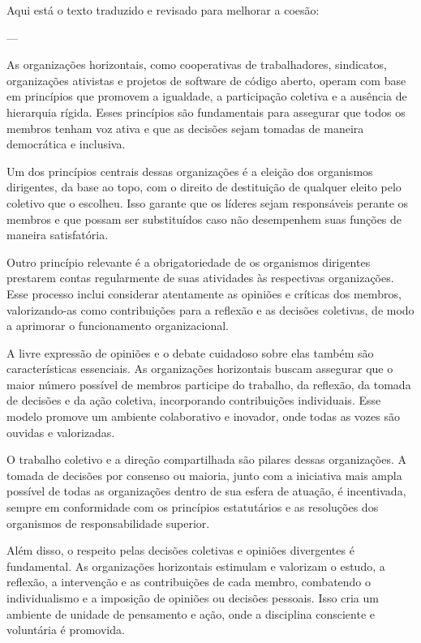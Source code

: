 Aqui está o texto traduzido e revisado para melhorar a coesão:

---

As organizações horizontais, como cooperativas de trabalhadores, sindicatos, organizações ativistas e projetos de software de código aberto, operam com base em princípios que promovem a igualdade, a participação coletiva e a ausência de hierarquia rígida. Esses princípios são fundamentais para assegurar que todos os membros tenham voz ativa e que as decisões sejam tomadas de maneira democrática e inclusiva.

Um dos princípios centrais dessas organizações é a eleição dos organismos dirigentes, da base ao topo, com o direito de destituição de qualquer eleito pelo coletivo que o escolheu. Isso garante que os líderes sejam responsáveis perante os membros e que possam ser substituídos caso não desempenhem suas funções de maneira satisfatória.

Outro princípio relevante é a obrigatoriedade de os organismos dirigentes prestarem contas regularmente de suas atividades às respectivas organizações. Esse processo inclui considerar atentamente as opiniões e críticas dos membros, valorizando-as como contribuições para a reflexão e as decisões coletivas, de modo a aprimorar o funcionamento organizacional.

A livre expressão de opiniões e o debate cuidadoso sobre elas também são características essenciais. As organizações horizontais buscam assegurar que o maior número possível de membros participe do trabalho, da reflexão, da tomada de decisões e da ação coletiva, incorporando contribuições individuais. Esse modelo promove um ambiente colaborativo e inovador, onde todas as vozes são ouvidas e valorizadas.

O trabalho coletivo e a direção compartilhada são pilares dessas organizações. A tomada de decisões por consenso ou maioria, junto com a iniciativa mais ampla possível de todas as organizações dentro de sua esfera de atuação, é incentivada, sempre em conformidade com os princípios estatutários e as resoluções dos organismos de responsabilidade superior.

Além disso, o respeito pelas decisões coletivas e opiniões divergentes é fundamental. As organizações horizontais estimulam e valorizam o estudo, a reflexão, a intervenção e as contribuições de cada membro, combatendo o individualismo e a imposição de opiniões ou decisões pessoais. Isso cria um ambiente de unidade de pensamento e ação, onde a disciplina consciente e voluntária é promovida.

